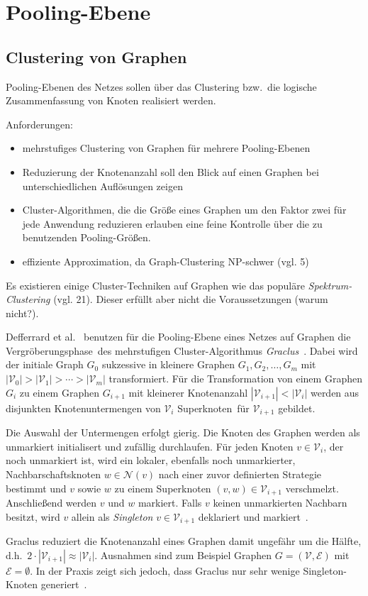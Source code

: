 \section{Pooling-Ebene}

\subsection{Clustering von Graphen}

Pooling-Ebenen des Netzes sollen über das Clustering bzw.\ die logische Zusammenfassung von Knoten realisiert werden.

Anforderungen:

\begin{itemize}
  \item mehrstufiges Clustering von Graphen für mehrere Pooling-Ebenen
  \item Reduzierung der Knotenanzahl soll den Blick auf einen Graphen bei unterschiedlichen Auflösungen zeigen
  \item Cluster-Algorithmen, die die Größe eines Graphen um den Faktor zwei für jede Anwendung reduzieren erlauben eine feine Kontrolle über die zu benutzenden Pooling-Größen.
  \item effiziente Approximation, da Graph-Clustering NP-schwer (vgl. 5)
\end{itemize}

Es existieren einige Cluster-Techniken auf Graphen wie das populäre \emph{Spektrum-Clustering} (vgl. 21).
Dieser erfüllt aber nicht die Voraussetzungen (warum nicht?).

Defferrard et al.~\cite{Defferrard} benutzen für die Pooling-Ebene eines Netzes auf Graphen die \glqq{}Vergröberungsphase\grqq\ des mehrstufigen Cluster-Algorithmus \emph{Graclus}~\cite{Dhillon}.
Dabei wird der initiale Graph $G_0$ sukzessive in kleinere Graphen $G_1, G_2, \ldots, G_m$ mit $|\mathcal{V}_0| > |\mathcal{V}_1| > \cdots > |\mathcal{V}_m|$ transformiert.
Für die Transformation von einem Graphen $G_i$ zu einem Graphen $G_{i+1}$ mit kleinerer Knotenanzahl $|\mathcal{V}_{i+1}| < |\mathcal{V}_i|$ werden aus disjunkten Knotenuntermengen von $\mathcal{V}_i$ \glqq{}Superknoten\grqq\ für $\mathcal{V}_{i+1}$ gebildet.

Die Auswahl der Untermengen erfolgt gierig.
Die Knoten des Graphen werden als unmarkiert initialisert und zufällig durchlaufen.
Für jeden Knoten $v \in \mathcal{V}_i$, der noch unmarkiert ist, wird ein lokaler, ebenfalls noch unmarkierter, Nachbarschaftsknoten $w \in \mathcal{N}(v)$ nach einer zuvor definierten Strategie bestimmt und $v$ sowie $w$ zu einem Superknoten $(v, w) \in \mathcal{V}_{i+1}$ verschmelzt.
Anschließend werden $v$ und $w$ markiert.
Falls $v$ keinen unmarkierten Nachbarn besitzt, wird $v$ allein als \emph{Singleton} $v \in \mathcal{V}_{i+1}$ deklariert und markiert~\cite{Dhillon}.

Graclus reduziert die Knotenanzahl eines Graphen damit ungefähr um die Hälfte, d.h.\ $2 \cdot |\mathcal{V}_{i+1}| \approx |\mathcal{V}_i|$.
Ausnahmen sind zum Beispiel Graphen $G = (\mathcal{V}, \mathcal{E})$ mit $\mathcal{E} = \emptyset$.
In der Praxis zeigt sich jedoch, dass Graclus nur sehr wenige Singleton-Knoten generiert~\cite{Defferrard}.
